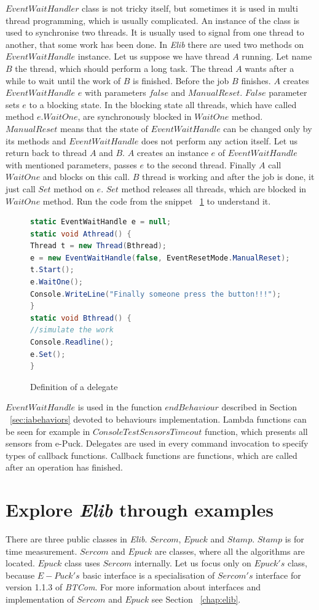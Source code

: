   $EventWaitHandler$ class is not tricky itself, but sometimes it is used in multi thread programming, which is usually complicated.
  An instance of the class is used to synchronise two threads. It is usually used to signal from one thread to another, 
  that some work has been done. In {\it Elib} there are used two methods on $EventWaitHandle$ instance.
  Let us suppose we have thread $A$ running. Let name $B$ the thread, which should perform a long task. 
  The thread $A$ wants after a while to wait until the work of $B$ is finished.
  Before the job $B$ finishes. $A$ creates $EventWaitHandle$ $e$ with parameters $false$ and $ManualReset$. 
  $False$ parameter sets $e$ to a blocking state. In the blocking state all threads, which have called method $e.WaitOne$, 
  are synchronously blocked in $WaitOne$ method. $ManualReset$ means that the state of $EventWaitHandle$ 
  can be changed only by its methods and $EventWaitHandle$ does not perform any action itself.
  Let us return back to thread $A$ and $B$. $A$ creates an instance $e$ of $EventWaitHandle$ with mentioned parameters, 
  passes $e$ to the second thread. 
  Finally $A$ call $WaitOne$ and blocks on this call.
  $B$ thread is working and after the job is done, it just call $Set$ method on $e$. 
  $Set$ method releases all threads, which are blocked in $WaitOne$ method.
  Run the code from the snippet ~\ref{ewh} to understand it.

          
\begin{figure}[!hbp]
\begin{lstlisting}[language=cs]
static EventWaitHandle e = null;
static void Athread() {
Thread t = new Thread(Bthread);
e = new EventWaitHandle(false, EventResetMode.ManualReset);
t.Start();
e.WaitOne();
Console.WriteLine("Finally someone press the button!!!");
}
static void Bthread() {
//simulate the work      
Console.Readline();
e.Set();
}
\end{lstlisting}
\caption{Definition of a delegate} \label{ewh}
\end{figure}

   $EventWaitHandle$ is used in the function $endBehaviour$ described in Section ~\ref{sec:iabehaviors} 
   devoted to behaviours implementation.
   Lambda functions can be seen for example in $ConsoleTestSensorsTimeout$ function, which presents all sensors from e-Puck.
   Delegates are used in every command invocation to specify types of callback functions.
   Callback functions are functions, which are called after an operation has finished.
  
\section{Explore {\it Elib} through examples} \label{sec:interfaces}
  There are three public classes in {\it Elib}. $Sercom$, $Epuck$ and $Stamp$.
  $Stamp$ is for time measurement. $Sercom$ and $Epuck$ are classes, where all the algorithms are located.
  $Epuck$ class uses $Sercom$ internally.
  Let us focus only on $Epuck's$ class, because $E-Puck's$ basic interface is a specialisation of $Sercom's$
  interface for version 1.1.3 of {\it BTCom}.
  For more information about interfaces and implementation of $Sercom$ and $Epuck$ see Section ~\ref{chap:elib}.

